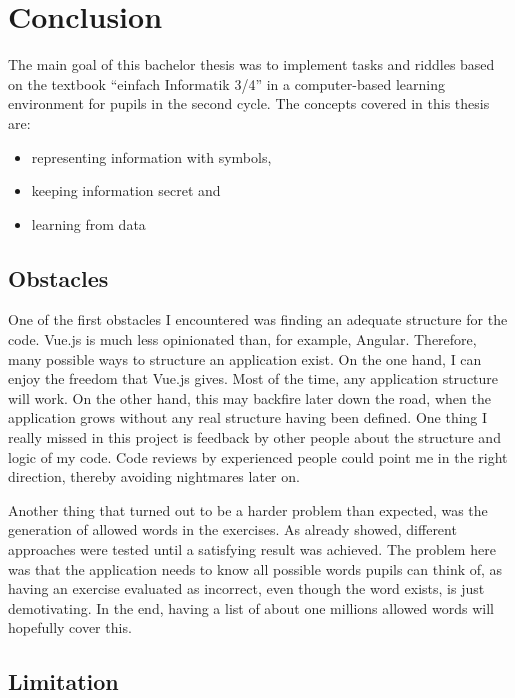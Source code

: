 \chapter{Conclusion}
\label{chapter:conclusion}

The main goal of this bachelor thesis was to implement tasks and riddles based on the textbook “einfach Informatik 3/4” in a computer-based learning environment for pupils in the second cycle. The concepts covered in this thesis are:

\begin{itemize}
    \item representing information with symbols,
    \item keeping information secret and
    \item learning from data
\end{itemize}

\section{Obstacles}
\label{section:obstacles}

One of the first obstacles I encountered was finding an adequate structure for the code. Vue.js is much less opinionated than, for example, Angular. Therefore, many possible ways to structure an application exist. On the one hand, I can enjoy the freedom that Vue.js gives. Most of the time, any application structure will work. On the other hand, this may backfire later down the road, when the application grows without any real structure having been defined. One thing I really missed in this project is feedback by other people about the structure and logic of my code. Code reviews by experienced people could point me in the right direction, thereby avoiding nightmares later on.

Another thing that turned out to be a harder problem than expected, was the generation of allowed words in the  exercises. As already showed, different approaches were tested until a satisfying result was achieved. The problem here was that the application needs to know all possible words pupils can think of, as having an exercise evaluated as incorrect, even though the word exists, is just demotivating. In the end, having a list of about one millions allowed words will hopefully cover this.

\section{Limitation}
\label{section:limitation}

